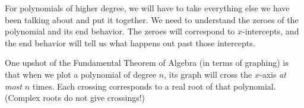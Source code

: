 \documentclass{ximera}
\begin{document}

For polynomials of higher degree, we will have to take everything else we have been talking about and put it together.  
We need to understand the zeroes of the polynomial and its end behavior.  The zeroes will correspond to $x$-intercepts, and the
end behavior will tell us what happens out past those intercepts.

One upshot of the Fundamental Theorem of Algebra (in terms of graphing) is that when we plot a
polynomial of degree $n$, its graph will cross the $x$-axis \emph{at most}
$n$ times.  Each crossing corresponds to a real root of that polynomial.  (Complex roots do not give crossings!)
\end{document}
